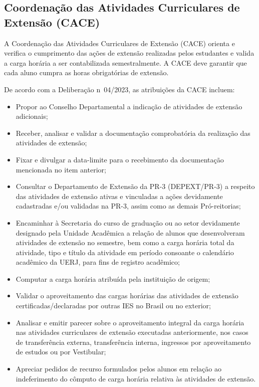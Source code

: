 \subsection{Coordenação das Atividades Curriculares de Extensão (CACE)}

A Coordenação das Atividades Curriculares de Extensão (CACE) orienta e verifica o cumprimento das ações de extensão realizadas pelos estudantes e valida a carga horária a ser contabilizada semestralmente. A CACE deve garantir que cada aluno cumpra as horas obrigatórias de extensão.

De acordo com a Deliberação n\textordmasculine~04/2023, as atribuições da CACE incluem:

\begin{itemize}
    \item Propor ao Conselho Departamental a indicação de atividades de extensão adicionais;
    \item Receber, analisar e validar a documentação comprobatória da realização das atividades de extensão;
    \item Fixar e divulgar a data-limite para o recebimento da documentação mencionada no item anterior;
    \item Consultar o Departamento de Extensão da PR-3 (DEPEXT/PR-3) a respeito das atividades de extensão ativas e vinculadas a ações devidamente cadastradas e/ou validadas na PR-3, assim como as demais Pró-reitorias;
    \item Encaminhar à Secretaria do curso de graduação ou ao setor devidamente designado pela Unidade Acadêmica a relação de alunos que desenvolveram atividades de extensão no semestre, bem como a carga horária total da atividade, tipo e título da atividade em período consoante o calendário acadêmico da UERJ, para fins de registro acadêmico;
    \item Computar a carga horária atribuída pela instituição de origem;
    \item Validar o aproveitamento das cargas horárias das atividades de extensão certificadas/declaradas por outras IES no Brasil ou no exterior;
    \item Analisar e emitir parecer sobre o aproveitamento integral da carga horária nas atividades curriculares de extensão executadas anteriormente, nos casos de transferência externa, transferência interna, ingressos por aproveitamento de estudos ou por Vestibular;
    \item Apreciar pedidos de recurso formulados pelos alunos em relação ao indeferimento do cômputo de carga horária relativa às atividades de extensão.

\end{itemize}

